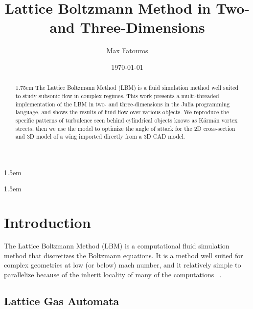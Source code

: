 


\title{Lattice Boltzmann Method in Two- and Three-Dimensions}

\author{Max Fatouros}

\date{\today}





\maketitle
\vspace{1cm}
\begin{abstract}
    \baselineskip 1.75em
    \noindent The Lattice Boltzmann Method (LBM) is a fluid simulation method well suited to study subsonic flow in complex regimes.
    This work presents a multi-threaded implementation of the LBM in two- and three-dimensions in the Julia programming language, and shows the results of fluid flow over various objects.
    We reproduce the specific patterns of turbulence seen behind cylindrical objects knows as K\'arm\'an vortex streets, then we use the model to optimize the angle of attack for the 2D cross-section and 3D model of a wing imported directly from a 3D CAD model.
\end{abstract}


\newpage

\baselineskip 1.5em
\tableofcontents


\newpage
\baselineskip 1.5em

\setcounter{page}{1}

\section{Introduction}\label{sec:introduction}

The Lattice Boltzmann Method (LBM) is a computational fluid simulation method that discretizes the Boltzmann equations.
It is a method well suited for complex geometries at low (or below) mach number, and it relatively simple to parallelize because of the inherit locality of many of the computations ~\cite{bottcher_computational_2021,arumuga_perumal_review_2015}.

\subsection{Lattice Gas Automata}

